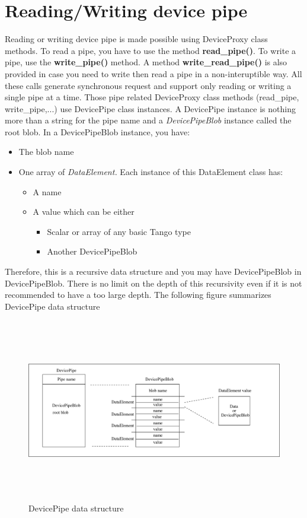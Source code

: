 \section{Reading/Writing device pipe}

Reading or writing device pipe is made possible using DeviceProxy
class methods. To read a pipe, you have to use the method \textbf{read\_pipe()}.
To write a pipe, use the \textbf{write\_pipe()} method. A method \textbf{write\_read\_pipe()}
is also provided in case you need to write then read a pipe in a non-interuptible
way. All these calls generate synchronous request and support only
reading or writing a single pipe at a time. Those pipe related DeviceProxy
class methods (read\_pipe, write\_pipe,...) use DevicePipe class instances.
A DevicePipe instance is nothing more than a string
for the pipe name and a \emph{DevicePipeBlob} instance called the
root blob. In a DevicePipeBlob instance, you
have:
\begin{itemize}
\item The blob name
\item One array of \emph{DataElement. }Each instance of this DataElement
class has:

\begin{itemize}
\item A name
\item A value which can be either

\begin{itemize}
\item Scalar or array of any basic Tango type
\item Another DevicePipeBlob
\end{itemize}
\end{itemize}
\end{itemize}
Therefore, this is a recursive data structure and you may have DevicePipeBlob
in DevicePipeBlob. There is no limit on the depth of this recursivity
even if it is not recommended to have a too large depth. The following
figure summarizes DevicePipe data structure
\begin{figure}[H]
\begin{centering}
\includegraphics[width=14cm,height=8cm]{gen_api/pipe}
\par\end{centering}
\caption{DevicePipe data structure\label{ }}
\end{figure}

